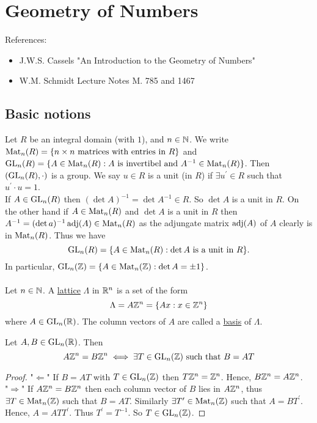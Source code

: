 \documentclass[NumTh.tex]{subfiles}
\begin{document}
\section{Geometry of Numbers}

References:
\begin{itemize}
  \item J.W.S. Cassels "An Introduction to the Geometry of Numbers"
  \item W.M. Schmidt Lecture Notes M. 785 and 1467
\end{itemize}

\subsection{Basic notions}
Let $R$ be an integral domain (with $1$), and $n \in \mathbb{N}$.
We write $\operatorname{Mat}_n(R) = \{ n \times n \text{ matrices with entries in } R\}$
and $\operatorname{GL}_n(R) = \{ A \in \operatorname{Mat}_n(R): A \text{ is invertibel and } A^{-1} \in \operatorname{Mat}_n(R) \}$.
Then $(\operatorname{GL}_n(R), \cdot)$ is a group. We say $u \in R$ is a unit (in $R$) if $\exists u^\prime \in R$ such that $u^\prime \cdot u = 1$.\\
If $A \in \operatorname{GL}_n(R)$ then $(\det A)^{-1} = \det A^{-1} \in R$. So $\det A$ is a unit in $R$.
On the other hand if $A \in \operatorname{Mat}_n(R)$ and $\det A$ is a unit in $R$ then $A^{-1} = (\det a)^{-1} \operatorname{adj}(A) \in \operatorname{Mat}_n(R)$ as the adjungate matrix $\operatorname{adj}(A)$ of $A$ clearly is in $\operatorname{Mat}_n(R)$. 
Thus we have
\[ \operatorname{GL}_n(R) = \{ A \in \operatorname{Mat}_n(R) : \det A \text{ is a unit in } R \} \text{.} \]
In particular, $\operatorname{GL}_n(\mathbb{Z}) = \{ A \in \operatorname{Mat}_n(\mathbb{Z}): \det A = \pm 1 \}$.\\
\\
Let $n \in \mathbb{N}$. A \underline{lattice} $\Lambda$ in $\mathbb{R}^n$ is a set of the form
\[ \Lambda = A \mathbb{Z}^n = \{ Ax : x \in \mathbb{Z}^n \} \]
where $A \in \operatorname{GL}_n(\mathbb{R})$.
The column vectors of $A$ are called a \underline{basis} of $\Lambda$.

\begin{lemma}[2.1.1 \label{l_2_1_1}]
  Let $A,B \in \operatorname{GL}_n(\mathbb{R})$. Then 
  \[ A \mathbb{Z}^n = B \mathbb{Z}^n \iff \exists T \in \operatorname{GL}_n(\mathbb{Z}) \text{ such that } B = AT \]
\end{lemma}

\begin{proof}
  "$\Leftarrow$" If $B = AT$ with $T \in \operatorname{GL}_n(\mathbb{Z})$ then $T \mathbb{Z}^n = \mathbb{Z}^n$.
  Hence, $B \mathbb{Z}^n = A \mathbb{Z}^n$.\\
  "$\Rightarrow$" If $A\mathbb{Z}^n = B \mathbb{Z}^n$ then each column vector of $B$ lies in $A \mathbb{Z}^n$,
  thus $\exists T \in \operatorname{Mat}_n(\mathbb{Z})$ such that $B = AT$.
  Similarly $\exists T^\prime \in \operatorname{Mat}_n(\mathbb{Z})$ such that $A = B T^\prime$.
  Hence, $ A = A T T^\prime$.
  Thus $T^\prime = T^{-1}$. So $T \in \operatorname{GL}_n(\mathbb{Z})$.
\end{proof}
\end{document}
